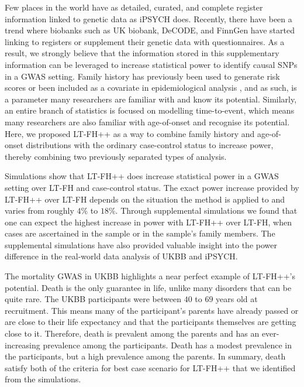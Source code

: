 
Few places in the world have as detailed, curated, and complete register information linked to genetic data as iPSYCH does. Recently, there have been a trend where biobanks such as UK biobank, DeCODE, and FinnGen have started linking to registers or supplement their genetic data with questionnaires. As a result, we strongly believe that the information stored in this supplementary information can be leveraged to increase statistical power to identify causal SNPs in a GWAS setting. Family history has previously been used to generate risk scores \cite{kannel1990contribution,splansky2007third} or been included as a covariate in epidemiological analysis \cite{ejlskov2021prediction,schendel2022evaluating}, and as such, is a parameter many researchers are familiar with and know its potential. Similarly, an entire branch of statistics is focused on modelling time-to-event, which means many researchers are also familiar with age-of-onset and recognise its potential. Here, we proposed LT-FH++ as a way to combine family history and age-of-onset distributions with the ordinary case-control status to increase power, thereby combining two previously separated types of analysis.

Simulations show that LT-FH++ does increase statistical power in a GWAS setting over LT-FH and case-control status. The exact power increase provided by LT-FH++ over LT-FH depends on the situation the method is applied to and varies from roughly $ 4\% $ to $ 18\% $. Through supplemental simulations we found that one can expect the highest increase in power with LT-FH++ over LT-FH, when cases are ascertained in the sample or in the sample's family members. The supplemental simulations have also provided valuable insight into the power difference in the real-world data analysis of UKBB and iPSYCH.

The mortality GWAS in UKBB highlights a near perfect example of LT-FH++'s potential. Death is the only guarantee in life, unlike many disorders that can be quite rare. The UKBB participants were between $ 40 $ to $ 69 $ years old at recruitment. This means many of the participant's parents have already passed or are close to their life expectancy and that the participants themselves are getting close to it. Therefore, death is prevalent among the parents and has an ever-increasing prevalence among the participants. Death has a modest prevalence in the participants, but a high prevalence among the parents. In summary, death satisfy both of the criteria for best case scenario for LT-FH++ that we identified from the simulations. 

